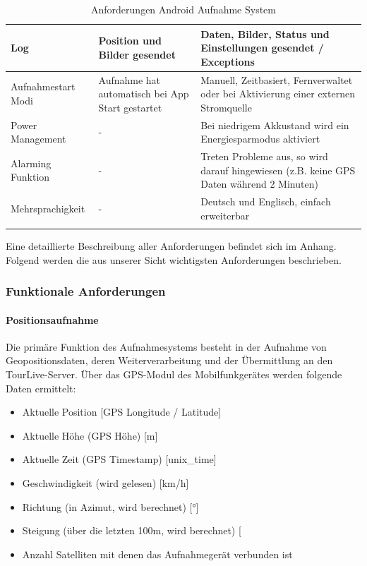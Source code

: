 {\begin{longtable}{  p{3.5cm} | p{4.3cm} | p{4.3cm} }
    \hline 
    Log & Position und Bilder gesendet & Daten, Bilder, Status und Einstellungen gesendet / Exceptions\\
    \hline 
    Aufnahmestart Modi & Aufnahme hat automatisch bei App Start gestartet & Manuell, Zeitbasiert, Fernverwaltet oder bei Aktivierung einer externen Stromquelle\\
    \hline 
   	Power Management & - & Bei niedrigem Akkustand wird ein Energiesparmodus aktiviert\\
    \hline 
    Alarming Funktion & - & Treten Probleme aus, so wird darauf hingewiesen (z.B. keine GPS Daten w\"{a}hrend 2 Minuten)\\
    \hline 
    Mehrsprachigkeit & - & Deutsch und Englisch, einfach erweiterbar\\

    
    
\caption{Anforderungen Android Aufnahme System}
\end{longtable}}

Eine detaillierte Beschreibung aller Anforderungen befindet sich im Anhang. Folgend werden die aus unserer Sicht wichtigsten Anforderungen beschrieben.

\subsubsection{Funktionale Anforderungen}
\paragraph{Positionsaufnahme}
Die prim\"{a}re Funktion des Aufnahmesystems besteht in der Aufnahme von Geopositionsdaten, deren Weiterverarbeitung und der Übermittlung an den TourLive-Server. Über das GPS-Modul des Mobilfunkger\"{a}tes werden folgende Daten ermittelt:
\begin{itemize}
\item Aktuelle Position [GPS Longitude / Latitude]
\item Aktuelle H\"{o}he (GPS H\"{o}he) [m]
\item Aktuelle Zeit (GPS Timestamp) [unix\_time]
\item Geschwindigkeit (wird gelesen) [km/h]
\item Richtung (in Azimut, wird berechnet) [°]
\item Steigung (\"{u}ber die letzten 100m, wird berechnet) [%
\item Anzahl Satelliten mit denen das Aufnahmeger\"{a}t verbunden ist
\end{itemize}

